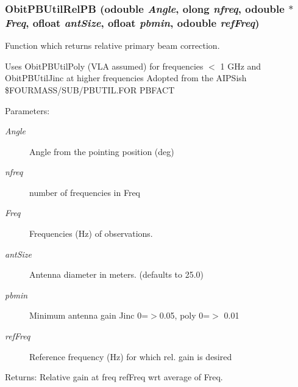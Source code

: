 \subsubsection{ Obit\-PBUtil\-Rel\-PB ({\bf odouble} {\em Angle}, {\bf olong} {\em nfreq}, {\bf odouble} $\ast$ {\em Freq}, {\bf ofloat} {\em ant\-Size}, {\bf ofloat} {\em pbmin}, {\bf odouble} {\em ref\-Freq})}\label{ObitPBUtil_8c_a2}


Function which returns relative primary beam correction. 

Uses Obit\-PBUtil\-Poly (VLA assumed) for frequencies $<$ 1 GHz and Obit\-PBUtil\-Jinc at higher frequencies Adopted from the AIPSish \$FOURMASS/SUB/PBUTIL.FOR PBFACT \begin{Desc}
\item[Parameters:]
\begin{description}
\item[{\em Angle}]Angle from the pointing position (deg) \item[{\em nfreq}]number of frequencies in Freq \item[{\em Freq}]Frequencies (Hz) of observations. \item[{\em ant\-Size}]Antenna diameter in meters. (defaults to 25.0) \item[{\em pbmin}]Minimum antenna gain Jinc 0=$>$0.05, poly 0=$>$ 0.01 \item[{\em ref\-Freq}]Reference frequency (Hz) for which rel. gain is desired \end{description}
\end{Desc}
\begin{Desc}
\item[Returns:]Relative gain at freq ref\-Freq wrt average of Freq. \end{Desc}
